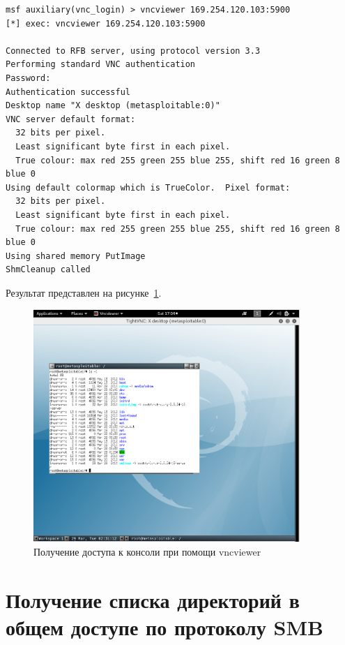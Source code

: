 \documentclass[10pt,a4paper]{report}
\begin{document}
		\begin{lstlisting}
msf auxiliary(vnc_login) > vncviewer 169.254.120.103:5900
[*] exec: vncviewer 169.254.120.103:5900

Connected to RFB server, using protocol version 3.3
Performing standard VNC authentication
Password: 
Authentication successful
Desktop name "X desktop (metasploitable:0)"
VNC server default format:
  32 bits per pixel.
  Least significant byte first in each pixel.
  True colour: max red 255 green 255 blue 255, shift red 16 green 8 blue 0
Using default colormap which is TrueColor.  Pixel format:
  32 bits per pixel.
  Least significant byte first in each pixel.
  True colour: max red 255 green 255 blue 255, shift red 16 green 8 blue 0
Using shared memory PutImage
ShmCleanup called

		\end{lstlisting}
		Результат представлен на рисунке~\ref{ris:vncviewerLogin}.
		\begin{figure}[h]
			\centering
			\includegraphics[width=0.9\textwidth]{imgs/vnc.png}
			\caption{Получение доступа к консоли при помощи vncviewer}
			\label{ris:vncviewerLogin}
		\end{figure}	
		
		
	\section{Получение списка директорий в общем доступе по протоколу SMB}
	
\end{document}

